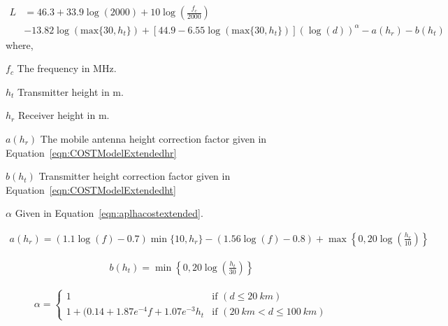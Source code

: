 \begin{equation} 
\label{eqn:COSTModelExtended}
\begin{aligned}
    L &= 46.3 + 33.9 \log(2000) + 10 \log\left(\frac{f_c}{2000}\right) \\
        &- 13.82 \log(\text{max}\{30,h_t\}) + [44.9 -6.55 \log(\text{max}\{30,h_t\})] (\log(d))^{\alpha} - a(h_r) - b(h_t)
\end{aligned}
\end{equation} 
where, 
\begin{where}
\item [$f_c$] The frequency in \si{MHz}.
\item [$h_t$] Transmitter height in \si{m}. 
\item [$h_r$] Receiver height in \si{m}.
\item [$a(h_r)$] The mobile antenna height correction factor given in Equation~\ref{eqn:COSTModelExtendedhr}
\item [$b(h_t)$] Transmitter height correction factor given in Equation~\ref{eqn:COSTModelExtendedht}
\item [$\alpha$] Given in Equation~\ref{eqn:aplhacostextended}.
\end{where}

\begin{align} 
\label{eqn:COSTModelExtendedhr}
a(h_r)=(1.1\log(f)-0.7) \min\{10,h_r\}-(1.56\log(f)-0.8)+\max\left\{0,20\log\left(\frac{h_r}{10}\right)\right\}
\end{align} 

\begin{align} 
\label{eqn:COSTModelExtendedht}
b(h_t)= \min\left\{0,20\log\left(\frac{h_t}{30}\right)\right\}
\end{align} 

\begin{align} 
\label{eqn:aplhacostextended}
\alpha = 
  \begin{cases}
      1 & \text{if } (d \leq \SI{20}{km}) \\
    1+(0.14+1.87e^{-4} f + 1.07e^{-3} h_t & \text{if } (\SI{20}{km} < d \leq \SI{100}{km})
  \end{cases}
\end{align} 